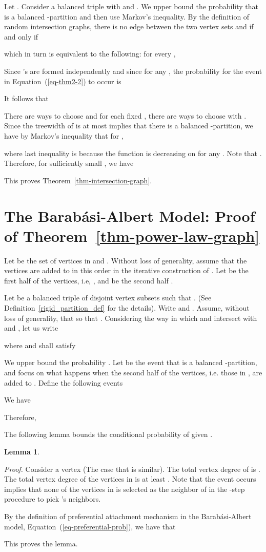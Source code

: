 \documentclass[11pt]{article}
\newtheorem{lemma}{Lemma}[section]
\providecommand{\qed}{\hfill }
\newenvironment{proof}[0]{\textit{Proof.} }{\hfill  \qed}
\begin{document}
Let .
Consider a balanced triple  with  and
. We upper bound the 
probability that  is a balanced -partition and then use Markov's inequality. By the definition of random intersection graphs, there is no edge between the two vertex sets  and  if and only if 

which in turn is equivalent to the following: for every , 

Since 's are formed independently and since  for any , the probability for the event in Equation~(\ref{eq-thm2-2}) to occur is
   
It follows that 

There are  ways to choose  and for each fixed , there
are  ways to choose  with . Since the treewidth of  is at most  implies that there is a balanced -partition, we have by Markov's inequality  that for ,

where last inequality is because the function 
is decreasing on  for any .
Note that .
Therefore, for sufficiently small , we have 

This proves Theorem~\ref{thm-intersection-graph}. 
\qed

\section{The Barab\'{a}si-Albert Model: Proof of Theorem~\ref{thm-power-law-graph}}
\label{sec-thm-3}
Let  be the set of vertices in  and
. Without loss of generality, assume that the vertices are added to  in this order in the 
iterative construction of .  Let  be the first half of the vertices, i.e, , and 
be the second half . 

Let  be a balanced triple of disjoint vertex subsets 
such that . (See Definition~\ref{rigid_partition_def} for the details).
Write  and . Assume, without loss of generality, that  
so that .   
Considering the way in which  and  intersect with  and , let us write

where  and  shall satisfy
 

We upper bound the probability 
.
Let  be the event that  is a balanced -partition, and
focus on what happens when the second half of the vertices, i.e. those in , are added
to . Define the following events

We have

Therefore,

The following lemma  bounds the conditional probability of  given . 
\begin{lemma}

\end{lemma}
\begin{proof}
Consider a vertex  (The case that  is similar).  
The total vertex degree of 
is . The total vertex degree of the vertices in  is at least 
. Note that the event  occurs implies that none of the vertices in 
 is selected as the neighbor of  in the -step procedure to pick 
's neighbors.

By the definition of preferential attachment mechanism in the Barab\'{a}si-Albert model, Equation~(\ref{eq-preferential-prob}), we have that 

This proves the lemma.   
\end{proof}
\end{document}

